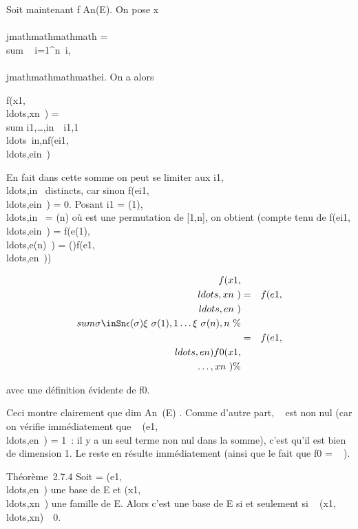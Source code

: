Soit maintenant f \in An(E). On pose x\\\\jmathmathmathmath
= \\sum ~
i=1^n\xi~i,\\\\jmathmathmathmathei. On a alors

f(x1,\\ldots,xn~)
= \\sum
i1,\ldots,in\in{}~\xi~i1,1\\ldots\xi~in,nf(ei1,\\ldots,ein~)

En fait dans cette somme on peut se limiter aux
i1,\\ldots,in~
distincts, car sinon
f(ei1,\\ldots,ein~)
= 0. Posant i1 =
\sigma(1),\\ldots,in~
= \sigma(n) où \sigma est une permutation de {[}1,n{]}, on obtient (compte tenu de
f(ei1,\\ldots,ein~)
=
f(e\sigma(1),\\ldots,e\sigma(n)~)
=
\epsilon(\sigma)f(e1,\\ldots,en~))

\begin{align*}
f(x1,\\ldots,xn~)&
=&
f(e1,\\ldots,en~)\\sum
\sigma\inSn\epsilon(\sigma)\xi~\sigma(1),1\ldots\xi~\sigma(n),n~\%&
\\ & =&
f(e1,\\ldots,en)f0(x1,\\\ldots,xn~)
\%& \\ \end{align*}

avec une définition évidente de f0.

Ceci montre clairement que dim An~(E)
. Comme d'autre part,
 ~ est
non nul (car on vérifie immédiatement que
~
(e1,\\ldots,en~)
= 1~: il y a un seul terme non nul dans la somme), c'est qu'il est bien
de dimension 1. Le reste en résulte immédiatement (ainsi que le fait que
f0 = ~
).

Théorème~2.7.4 Soit  =
(e1,\\ldots,en~)
une base de E et
(x1,\\ldots,xn~)
une famille de E. Alors c'est une base de E si et seulement si
~
(x1,\\ldots,xn)\mathrel\neq~~0.

